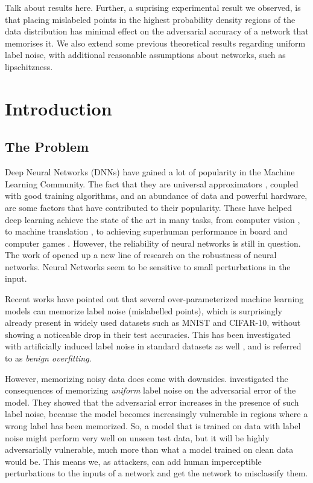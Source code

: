 \documentclass{ociamthesis}
\begin{document}
Talk about results here. Further, a suprising experimental result we observed,
is that placing mislabeled points in the highest probability density regions of
the data distribution has minimal effect on the adversarial accuracy of a
network that memorises it. We also extend some previous theoretical results
regarding uniform label noise, with additional reasonable assumptions about
networks, such as lipschitzness.

\tableofcontents

\chapter{Introduction}

\section{The Problem}

Deep Neural Networks (DNNs) have gained a lot of popularity in the Machine
Learning Community. The fact that they are universal approximators
\citep{hornik1989multilayer}, coupled with good training algorithms, and an
abundance of data and powerful hardware, are some factors that have contributed
to their popularity. These have helped deep learning achieve the state of the
art in many tasks, from computer vision \citep{imagenet}, to machine translation
\citep{seq2seq,attention-is-all-you-need}, to achieving superhuman performance
in board and computer games \citep{alpha-zero, starcraft}. However, the
reliability of neural networks is still in question. The work of \citet{42503}
opened up a new line of research on the robustness of neural networks. Neural
Networks seem to be sensitive to small perturbations in the input.

Recent works \citep{belkin2018understand,DBLP:journals/cacm/ZhangBHRV21} have
pointed out that several over-parameterized machine learning models can memorize
label noise (mislabelled points), which is surprisingly already present in
widely used datasets \citep{sanyal2021how} such as MNIST and CIFAR-10, without
showing a noticeable drop in their test accuracies. This has been investigated
with artificially induced label noise in standard datasets as well
\citep{sanyal2021how}, and is referred to as \emph{benign overfitting}.

However, memorizing noisy data does come with downsides. \citet{sanyal2021how}
investigated the consequences of memorizing \emph{uniform} label noise on the
adversarial error of the model. They showed that the adversarial error increases
in the presence of such label noise, because the model becomes increasingly
vulnerable in regions where a wrong label has been memorized. So, a model that
is trained on data with label noise might perform very well on unseen test data,
but it will be highly adversarially vulnerable, much more than what a model
trained on clean data would be. This means we, as attackers, can add human
imperceptible perturbations to the inputs of a network and get the network to
misclassify them.
\end{document}
